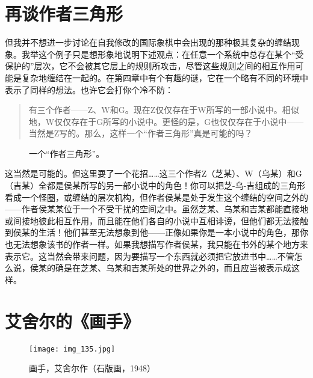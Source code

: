 \section{再谈作者三角形}

但我并不想进一步讨论在自我修改的国际象棋中会出现的那种极其复杂的缠结现象。我举这个例子只是想形象地说明下述观点：在任意一个系统中总存在某个“受保护的”层次，它不会被其它层上的规则所攻击，尽管这些规则之间的相互作用可能是复杂地缠结在一起的。在第四章中有个有趣的谜，它在一个略有不同的环境中表示了同样的想法。也许它会打你个冷不防：

\begin{quote}
有三个作者——Z、W和G。现在Z仅仅存在于W所写的一部小说中。相似地，W仅仅存在于G所写的小说中。更怪的是，G也仅仅存在于小说中——当然是Z写的。那么，这样一个“作者三角形”真是可能的吗？
\end{quote}

\begin{figure}
\caption[一个作者三角形。]
  {一个“作者三角形”。}
\end{figure}

这当然是可能的。但这里耍了一个花招……这三个作者Z（芝某）、W（乌某）和G（吉某）全都是侯某所写的另一部小说中的角色！你可以把芝-乌-吉组成的三角形看成一个怪圈，或缠结的层次机构，但作者侯某是处于发生这个缠结的空间之外的——作者侯某某位于一个不受干扰的空间之中。虽然芝某、乌某和吉某都能直接地或间接地彼此相互作用，而且能在他们各自的小说中互相诽谤，但他们都无法接触到侯某的生活！他们甚至无法想象到他——正像如果你是一本小说中的角色，那你也无法想象该书的作者一样。如果我想描写作者侯某，我只能在书外的某个地方来表示它。这当然会带来问题，因为要描写一个东西就必须把它放进书中……不管怎么说，侯某的确是在芝某、乌某和吉某所处的世界之外的，而且应当被表示成这样。

\section{艾舍尔的《画手》}

\begin{figure}
\texttt{[image: img\_135.jpg]}
\caption[画手，艾舍尔作。]
  {画手，艾舍尔作（石版画，1948）}
\end{figure}

